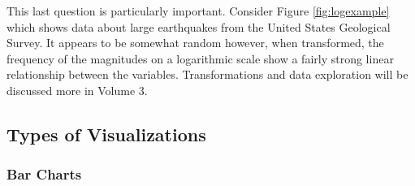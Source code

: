 This last question is particularly important.
Consider Figure \ref{fig:logexample} which shows data about large earthquakes from the United States Geological Survey.
It appears to be somewhat random however, when transformed, the frequency of the magnitudes on a logarithmic scale show a fairly strong linear relationship
between the variables.
Transformations and data exploration will be discussed more in Volume 3.

\newpage

\subsection*{Types of Visualizations} %

\subsubsection*{Bar Charts} %

